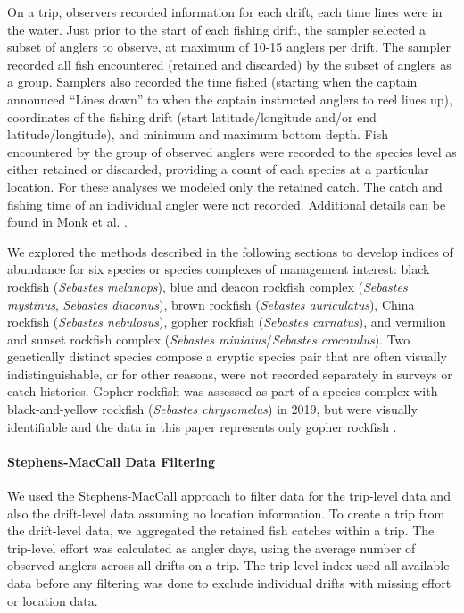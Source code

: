 \documentclass[
  authoryear,
  preprint,
  3p]{elsarticle}
\let\oldparagraph\paragraph
\renewcommand{\paragraph}[1]{\oldparagraph{#1}\mbox{}}
\begin{document}
On a trip, observers recorded information for each drift, each time
lines were in the water. Just prior to the start of each fishing drift,
the sampler selected a subset of anglers to observe, at maximum of 10-15
anglers per drift. The sampler recorded all fish encountered (retained
and discarded) by the subset of anglers as a group. Samplers also
recorded the time fished (starting when the captain announced ``Lines
down'' to when the captain instructed anglers to reel lines up),
coordinates of the fishing drift (start latitude/longitude and/or end
latitude/longitude), and minimum and maximum bottom depth. Fish
encountered by the group of observed anglers were recorded to the
species level as either retained or discarded, providing a count of each
species at a particular location. For these analyses we modeled only the
retained catch. The catch and fishing time of an individual angler were
not recorded. Additional details can be found in Monk et al.
\citeyearpar{Monk:2014:DRD}.

We explored the methods described in the following sections to develop
indices of abundance for six species or species complexes of management
interest: black rockfish (\emph{Sebastes melanops}), blue and deacon
rockfish complex (\emph{Sebastes mystinus}, \emph{Sebastes diaconus}),
brown rockfish (\emph{Sebastes auriculatus}), China rockfish
(\emph{Sebastes nebulosus}), gopher rockfish (\emph{Sebastes carnatus}),
and vermilion and sunset rockfish complex (\emph{Sebastes
miniatus}/\emph{Sebastes crocotulus}). Two genetically distinct species
compose a cryptic species pair that are often visually
indistinguishable, or for other reasons, were not recorded separately in
surveys or catch histories. Gopher rockfish was assessed as part of a
species complex with black-and-yellow rockfish (\emph{Sebastes
chrysomelus}) in 2019, but were visually identifiable and the data in
this paper represents only gopher rockfish \citep{Monk:2019:CSG}.

\hypertarget{stephens-maccall-data-filtering}{%
\paragraph{Stephens-MacCall Data
Filtering}\label{stephens-maccall-data-filtering}}

We used the Stephens-MacCall approach to filter data for the trip-level
data and also the drift-level data assuming no location information. To
create a trip from the drift-level data, we aggregated the retained fish
catches within a trip. The trip-level effort was calculated as angler
days, using the average number of observed anglers across all drifts on
a trip. The trip-level index used all available data before any
filtering was done to exclude individual drifts with missing effort or
location data.
\end{document}
